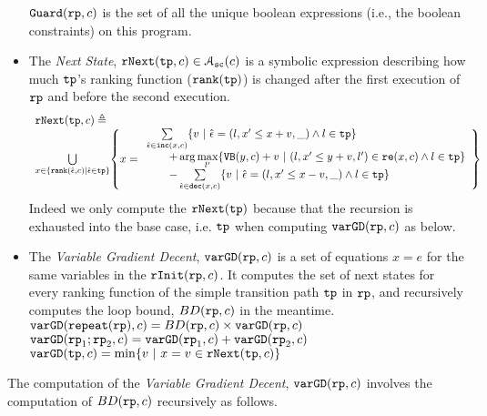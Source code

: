 \begin{defn}
\begin{itemize}
\[  \]
  $\mathtt{Guard}(\mathtt{rp}, c)$ is the set of all the unique boolean expressions (i.e., the boolean constraints) on this program.
 \item The \emph{Next State}, $\mathtt{rNext}(\mathtt{tp}, c) \in \mathcal{A}_{\mathtt{sc}}(c)$ 
 is a
 symbolic expression describing how much $\mathtt{tp}$'s ranking function ($\mathtt{rank}(\mathtt{tp})$) is changed after the first execution of $\mathtt{rp}$ and before the second execution.
 \[
   \begin{array}{l}
   \rfnext(\tpath, c) \triangleq 
   \\
   \bigcup\limits_{x \in \left\{ \locbound(\absevent, c) | \absevent \in \tpath \right\}}
   \left\{ x = \begin{array}{l}
  \sum\limits_{\absevent \in \inc(x, c) }
   \left\{ v ~\middle\vert~ \absevent = (l, x' \leq x + v, \_) \land l \in \tpath\right\}
   \\ \qquad 
   + \arg\max\limits_{l' }
      \left\{ \varinvar(y, c) + v ~\middle\vert~ (l, x' \leq y + v, l') \in \reset(x, c) \land l \in \tpath\right\}
      \\ \qquad 
     - \sum\limits_{ \absevent \in \dec(x, c) }\left\{ 
       v ~\middle\vert~ \absevent = (l, x' \leq x - v, \_) \land l \in \tpath 
       \right\}
     \end{array}
   \right\} 
   \end{array}
 \]
 Indeed we only compute the $\mathtt{rNext}(\mathtt{tp})$ because that the recursion is exhausted into the base case, i.e. $\mathtt{tp}$ when computing $\mathtt{varGD}(\mathtt{rp}, c)$ as below.
 \item  The \emph{Variable Gradient Decent}, 
 $\mathtt{varGD}(\mathtt{rp}, c)$
 is a set of equations $x = e$ for the same variables in the $\mathtt{rInit}(\mathtt{rp}, c)$.
 It computes the set of next states for every ranking function of the simple transition path $\mathtt{tp}$ in $\mathtt{rp}$,
 and recursively computes the loop bound, $BD(\mathtt{rp}, c)$ in the meantime.
 \\
 {$\mathtt{varGD}(\mathtt{repeat}(\mathtt{rp}), c) =  BD(\mathtt{rp}, c)  \times
{\ensuremath{\mathtt{varGD}}(\ensuremath{\mathtt{rp}}, c)}$}
 \\
 $\mathtt{varGD}(\mathtt{rp}_1;\mathtt{rp}_2, c) =  \mathtt{varGD}(\mathtt{rp}_1, c) + \mathtt{varGD}(\mathtt{rp}_2, c)$
 \\
 $\varGD(\tpath, c) =  \min\left\{v  ~|~ x = v \in \rfnext(\tpath, c) \right\}  $  
\end{itemize}
\end{defn}
The computation of the \emph{Variable Gradient Decent}, 
$\mathtt{varGD}(\mathtt{rp}, c)$ involves the computation of $BD(\mathtt{rp}, c)$ recursively as follows.
